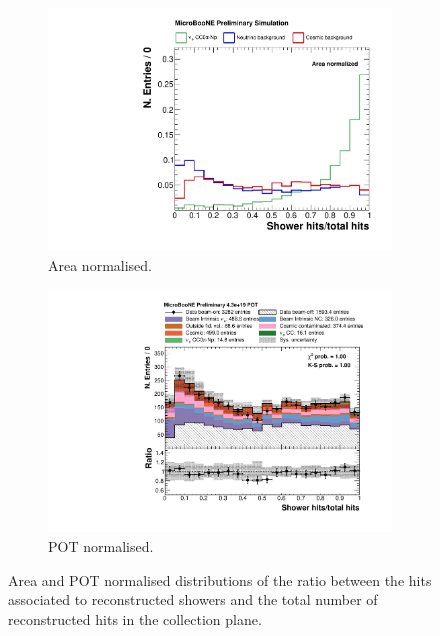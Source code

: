 \begin{figure}[htbp]
\centering
  \begin{subfigure}{0.49\textwidth}
    \includegraphics[width=\linewidth]{figures/h_hits_ratio_norm.pdf}
    \caption{Area normalised.} \label{fig:ratio_norm}
  \end{subfigure}
    \begin{subfigure}{0.49\textwidth}
    \includegraphics[width=\linewidth]{figures/h_hits_ratio.pdf}
    \caption{POT normalised.} \label{fig:ratio_pot}
  \end{subfigure}
  \caption{Area and POT normalised distributions of the ratio between the hits associated to reconstructed showers and the total number of reconstructed hits in the collection plane.}
\end{figure}

